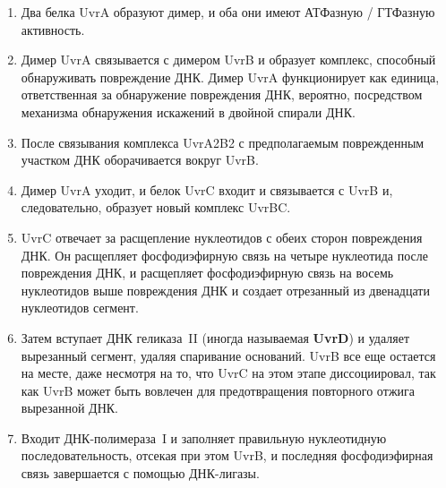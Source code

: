\begin{enumerate}
	\item Два белка UvrA образуют димер, и оба они имеют АТФазную / ГТФазную активность.
	
	\item Димер UvrA связывается с димером UvrB и образует комплекс, способный обнаруживать повреждение ДНК. Димер UvrA функционирует как единица, ответственная за обнаружение повреждения ДНК, вероятно, посредством механизма обнаружения искажений в двойной спирали ДНК.
	
	\item После связывания комплекса UvrA2B2 с предполагаемым поврежденным участком ДНК оборачивается вокруг UvrB.
	
	\item Димер UvrA уходит, и белок UvrC входит и связывается с UvrB и, следовательно, образует новый комплекс UvrBC.
	
	\item UvrC отвечает за расщепление нуклеотидов с обеих сторон повреждения ДНК. Он расщепляет фосфодиэфирную связь на четыре нуклеотида после повреждения ДНК, и расщепляет фосфодиэфирную связь на восемь нуклеотидов выше повреждения ДНК и создает отрезанный из двенадцати нуклеотидов сегмент.
	
	\item Затем вступает ДНК геликаза~II (иногда называемая \textbf{UvrD}) и удаляет вырезанный сегмент, удаляя спаривание оснований. UvrB все еще остается на месте, даже несмотря на то, что UvrC на этом этапе диссоциировал, так как UvrB может быть вовлечен для предотвращения повторного отжига вырезанной ДНК.
	
	\item Входит ДНК-полимераза~I и заполняет правильную нуклеотидную последовательность, отсекая при этом UvrB, и последняя фосфодиэфирная связь завершается с помощью ДНК-лигазы.
\end{enumerate}
